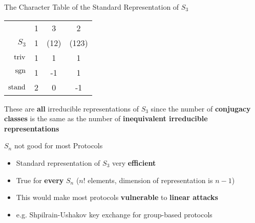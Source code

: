 \begin{frame}{The Character Table of the Standard Representation of $S_3$}
    \large
    \begin{center}
        \begin{tabular}{r | c  c  c}
                        & 1 & 3     & 2     \\
            $S_3$       & 1 & (12)  & (123) \\ \hline
            $\operatorname{triv}$     & 1 & 1     & 1     \\
            $\operatorname{sgn}$      & 1 & -1    & 1     \\
            $\operatorname{stand}$    & 2 & 0     & -1
        \end{tabular}
    \end{center}
    
    \pause
    \vspace{2em}
    These are \textbf{all} irreducible representations of $S_3$ since the number of \textbf{conjugacy classes} is the same as the number of \textbf{inequivalent irreducible representations}

\end{frame}

\begin{frame}{$S_n$ not good for most Protocols}
    \large
    \begin{itemize}
        \item Standard representation of $S_3$ very \textbf{efficient} \pause
        \item True for \textbf{every} $S_n$ ($n!$ elements, dimension of representation is $n - 1$) \pause
        \item This would make most protocols \textbf{vulnerable} to \textbf{linear attacks}
        \item e.g. Shpilrain-Ushakov key exchange for group-based protocols
    \end{itemize}

    \vspace{1em}
    {\hspace*{\fill} \cite{khovanov2022monoidal}}
\end{frame}

